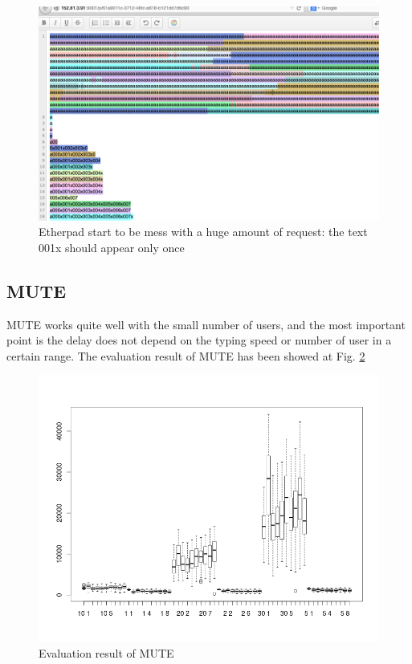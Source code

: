 \documentclass[a4paper,12pt]{report}
\begin{document}
	\begin{figure}
		\includegraphics[width=\textwidth]{etherpad2}
		\caption{Etherpad start to be mess with a huge amount of request: the text 001x should appear only once}
		\label{fig:fig3}
	\end{figure}

\subsection{MUTE}
MUTE works quite well with the small number of users, and the most important point is the delay does not depend on the typing speed or number of user in a certain range.
The evaluation result of MUTE has been showed at Fig. \ref{fig:fig4}

	\begin{figure}
		\includegraphics[width=\textwidth]{mute}
		\caption{Evaluation result of MUTE}
		\label{fig:fig4}
	\end{figure}
\end{document}
